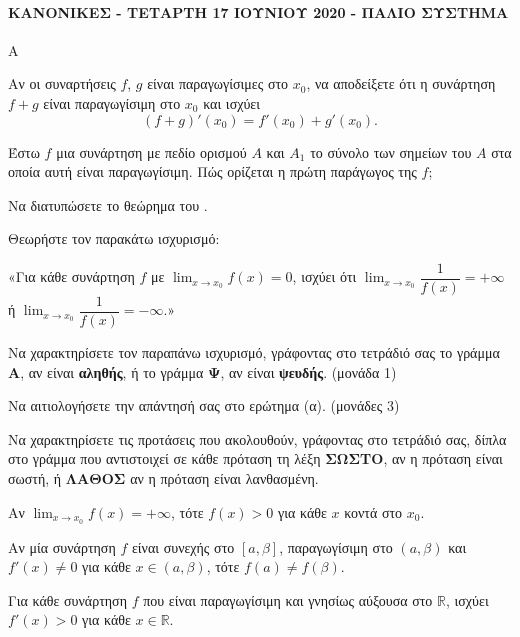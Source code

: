 \paragraph{ΚΑΝΟΝΙΚΕΣ - ΤΕΤΑΡΤΗ 17 ΙΟΥΝΙΟΥ 2020 - ΠΑΛΙΟ ΣΥΣΤΗΜΑ}
\begin{thema}{Α}
\begin{erwthma}
    \item Αν οι συναρτήσεις $f$, $g$ είναι παραγωγίσιμες στο $x_0$, να αποδείξετε ότι η συνάρτηση $f+g$ είναι παραγωγίσιμη στο $x_0$ και ισχύει
    \[
    (f+g)'(x_0) = f'(x_0) + g'(x_0).
    \]

    \item Έστω $f$ μια συνάρτηση με πεδίο ορισμού $A$ και $A_1$ το σύνολο των σημείων του $A$ στα οποία αυτή είναι παραγωγίσιμη. Πώς ορίζεται η πρώτη παράγωγος της $f$; 

    \item Να διατυπώσετε το θεώρημα του . 

    \item Θεωρήστε τον παρακάτω ισχυρισμό:

    «Για κάθε συνάρτηση $f$ με $\displaystyle\lim_{x \to x_0} f(x) = 0$, ισχύει ότι $\displaystyle\lim_{x \to x_0} \dfrac{1}{f(x)} = +\infty$ ή $\displaystyle\lim_{x \to x_0} \dfrac{1}{f(x)} = -\infty$.»

    \begin{alist}
        \item[α)] Να χαρακτηρίσετε τον παραπάνω ισχυρισμό, γράφοντας στο τετράδιό σας το γράμμα \textbf{Α}, αν είναι \textbf{αληθής}, ή το γράμμα \textbf{Ψ}, αν είναι \textbf{ψευδής}. \hfill(μονάδα 1)
        \item[β)] Να αιτιολογήσετε την απάντησή σας στο ερώτημα (α). \hfill(μονάδες 3)
    \end{alist}

    \item Να χαρακτηρίσετε τις προτάσεις που ακολουθούν, γράφοντας στο τετράδιό σας, δίπλα στο γράμμα που αντιστοιχεί σε κάθε πρόταση τη λέξη \textbf{ΣΩΣΤΟ}, αν η πρόταση είναι σωστή, ή \textbf{ΛΑΘΟΣ} αν η πρόταση είναι λανθασμένη.
    \begin{alist}
        \item Αν $\displaystyle\lim_{x \to x_0} f(x) = +\infty$, τότε $f(x) > 0$ για κάθε $x$ κοντά στο $x_0$.
        \item Αν μία συνάρτηση $f$ είναι συνεχής στο $[a,\beta]$, παραγωγίσιμη στο $(a,\beta)$ και $f'(x) \ne 0$ για κάθε $x \in (a,\beta)$, τότε $f(a) \ne f(\beta)$.
        \item Για κάθε συνάρτηση $f$ που είναι παραγωγίσιμη και γνησίως αύξουσα στο $\mathbb{R}$, ισχύει $f'(x) > 0$ για κάθε $x \in \mathbb{R}$.
    \end{alist}
\end{erwthma}
\end{thema}

